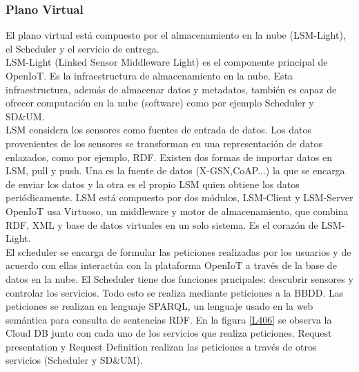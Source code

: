 \documentclass[12pt, twoside]{book}
\begin{document}
\subsubsection*{Plano Virtual}
El plano virtual está compuesto por el almacenamiento en la nube (LSM-Light), el Scheduler y el servicio de entrega. \\

LSM-Light (Linked Sensor Middleware Light) es el componente principal de OpenIoT. Es la infraestructura de almacenamiento en la nube. Esta infraestructura, además de almacenar datos y metadatos, también es capaz de ofrecer computación en la nube (software) como por ejemplo Scheduler y SD\&UM.\\ LSM considera los sensores como fuentes de entrada de datos. Los datos provenientes de los sensores se transforman en una representación de datos enlazados, como por ejemplo, RDF. Existen dos formas de importar datos en LSM, pull y push. Una es la fuente de datos (X-GSN,CoAP...) la que se encarga de enviar los datos y la otra es el propio LSM quien obtiene los datos periódicamente. LSM está compuesto por dos módulos, LSM-Client y LSM-Server\\

OpenIoT usa Virtuoso, un middleware y motor de almacenamiento, que combina RDF, XML y base de datos virtuales en un solo sistema. Es el corazón de LSM-Light. \\

El scheduler se encarga de formular las peticiones realizadas por los usuarios y de acuerdo con ellas interactúa con la plataforma OpenIoT a través de la base de datos en la nube. El Scheduler tiene dos funciones prncipales: descubrir sensores y controlar los servicios. Todo esto se realiza mediante peticiones a la BBDD. Las peticiones se realizan en lenguaje SPARQL, un lenguaje usado en la web semántica para consulta de sentencias RDF. En la figura \ref{L406} se observa la Cloud DB junto con cada uno de los servicios que realiza peticiones. Request presentation y Request Definition realizan las peticiones a través de otros servicios (Scheduler y SD\&UM).\\
\end{document}
